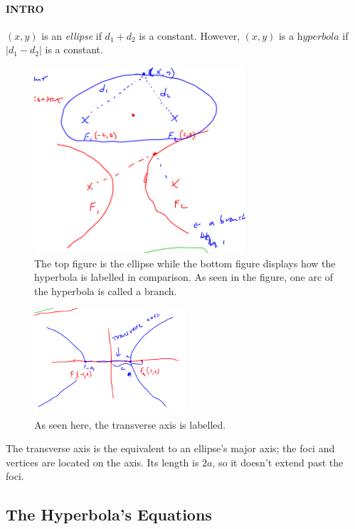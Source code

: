 \documentclass{article}
\newcommand{\highlight}[1]{%
  \colorbox{yellowOrange}{$\displaystyle#1$}}
\begin{document}
\paragraph{INTRO} $(x, y)$ is an \emph{ellipse} if $d_1 + d_2$ is a constant. However, $(x, y)$ is a \highlight{\textit{hyperbola}} if $|d_1 - d_2|$ is a constant.

\begin{figure}[H]
    \includegraphics[width=0.7\textwidth,center]{Hyperbola and ellipse.png}
    \caption{The top figure is the ellipse while the bottom figure displays how the hyperbola is labelled in comparison. As seen in the figure, one arc of the hyperbola is called a branch.}
    \label{fig:hyperbola2}
\end{figure}
\begin{figure}[H]
  \includegraphics[width=0.5\textwidth,center]{Hyperbola.png}
  \caption{As seen here, the transverse axis is labelled.}
  \label{fig:hyperbola3}
\end{figure}

The transverse axis is the equivalent to an ellipse's major axis; the foci and vertices are located on the axis. Its length is $2a$, so it doesn't extend past the foci.

\subsection{The Hyperbola's Equations}
\end{document}
